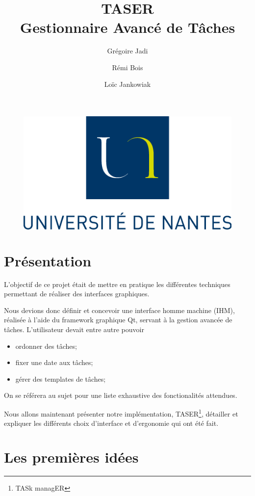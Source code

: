 \documentclass[11pt]{article}
\author{Grégoire Jadi \and{} Rémi Bois \and{} Loïc Jankowiak}
\title{TASER \\
Gestionnaire Avancé de Tâches}
\begin{document}
\maketitle
\begin{figure}[h]
  \centering
  \includegraphics{img/logo_nantes.png}  
\end{figure}

\newpage
\tableofcontents
\newpage


\section{Présentation}

L'objectif de ce projet était de mettre en pratique les différentes
techniques permettant de réaliser des interfaces graphiques.

Nous devions donc définir et concevoir une interface homme machine
(IHM), réalisée à l'aide du framework graphique Qt, servant à la
gestion avancée de tâches. L'utilisateur devait entre autre pouvoir
\begin{itemize}
\item ordonner des tâches;
\item fixer une date aux tâches;
\item gérer des templates de tâches;
\end{itemize}
On se référera au sujet pour une liste exhaustive des fonctionalités
attendues.

Nous allons maintenant présenter notre implémentation,
TASER\footnote{TASk managER}, détailler et expliquer les différents
choix d'interface et d'ergonomie qui ont été fait.


\section{Les premières idées}
\end{document}
